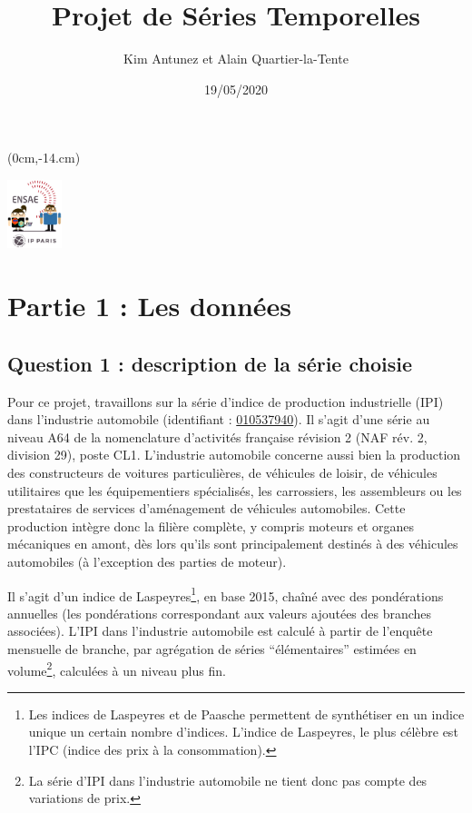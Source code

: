 \documentclass[french]{article}
\title{Projet de Séries Temporelles}
\author{Kim Antunez et Alain Quartier-la-Tente}
\date{19/05/2020}
\begin{document}
\maketitle

{
\hypersetup{linkcolor=}
\setcounter{tocdepth}{3}
\tableofcontents
}
\begin{textblock*}{\textwidth}(0cm,-14.cm)
\begin{center}
\includegraphics[height=2cm]{img/LOGO-ENSAE-avatar.png}
\end{center}
\end{textblock*}

\thispagestyle{empty}
\newpage\setcounter{page}{1}

\hypertarget{partie-1-les-donnuxe9es}{%
\section{Partie 1 : Les données}\label{partie-1-les-donnuxe9es}}

\hypertarget{question-1-description-de-la-suxe9rie-choisie}{%
\subsection{Question 1 : description de la série choisie}\label{question-1-description-de-la-suxe9rie-choisie}}

Pour ce projet, travaillons sur la série d'indice de production industrielle (IPI) dans l'industrie automobile (identifiant : \href{https://bdm.insee.fr/series/sdmx/data/SERIES_BDM/010537940}{010537940}).
Il s'agit d'une série au niveau A64 de la nomenclature d'activités française révision 2 (NAF rév. 2, division 29), poste CL1.
L'industrie automobile concerne aussi bien la production des constructeurs de voitures particulières, de véhicules de loisir, de véhicules utilitaires que les équipementiers spécialisés, les carrossiers, les assembleurs ou les prestataires de services d'aménagement de véhicules automobiles.
Cette production intègre donc la filière complète, y compris moteurs et organes mécaniques en amont, dès lors qu'ils sont principalement destinés à des véhicules automobiles (à l'exception des parties de moteur).

Il s'agit d'un indice de Laspeyres\footnote{Les indices de Laspeyres et de Paasche permettent de synthétiser en un indice unique un certain nombre d'indices. L'indice de Laspeyres, le plus célèbre est l'IPC (indice des prix à la consommation).}, en base 2015, chaîné avec des pondérations annuelles (les pondérations correspondant aux valeurs ajoutées des branches associées).
L'IPI dans l'industrie automobile est calculé à partir de l'enquête mensuelle de branche, par agrégation de séries ``élémentaires'' estimées en volume\footnote{La série d'IPI dans l'industrie automobile ne tient donc pas compte des variations de prix.}, calculées à un niveau plus fin.
\end{document}
